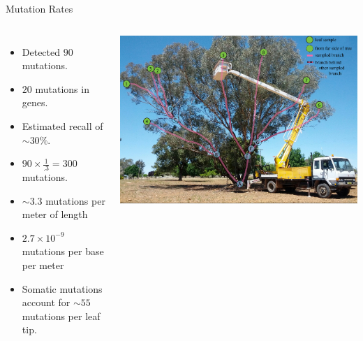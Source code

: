 \documentclass[table]{beamer}
\begin{document}
\begin{frame}{Mutation Rates}
\begin{columns}
\begin{itemize}
\item Detected $90$ mutations.
\item $20$ mutations in genes.
\item Estimated recall of $\sim30\%$.
\item $90\times\frac{1}{.3}=300$ mutations.
\item $\sim3.3$ mutations per meter of length
\item $2.7\times10^{-9}$ mutations per base per meter
\item Somatic mutations account for $\sim55$ mutations per leaf tip.
\end{itemize}
\includegraphics[width=\linewidth]{emel_1.jpg}
\end{columns}
\end{frame}
\end{document}
